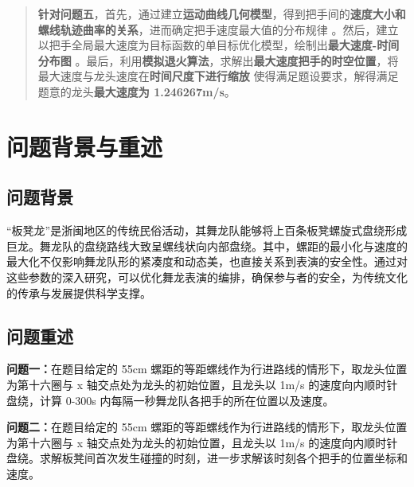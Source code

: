 \documentclass[a4paper]{article}
\begin{document}
\begin{abstract}
		\textbf{针对问题五}，首先，通过建立\textbf{运动曲线几何模型}，得到把手间的\textbf{速度大小和螺线轨迹曲率的关系}，进而确定把手速度最大值的分布规律%
		。然后，建立以把手全局最大速度为目标函数的单目标优化模型，绘制出\textbf{最大速度-时间分布图}%
		。最后，利用\textbf{模拟退火算法}，求解出\textbf{最大速度把手的时空位置}，将最大速度与龙头速度在\textbf{时间尺度下进行缩放}%
		使得满足题设要求，解得满足题意的龙头\textbf{最大速度为 1.246267m/s}。  \\
		\newline
	\end{abstract}

	\clearpage %

	\section{问题背景与重述}
	\subsection{问题背景}
	“板凳龙”是浙闽地区的传统民俗活动，其舞龙队能够将上百条板凳螺旋式盘绕形成巨龙。舞龙队的盘绕路线大致呈螺线状向内部盘绕。其中，螺距的最小化与速度的最大化不仅影响舞龙队形的紧凑度和动态美，也直接关系到表演的安全性。通过对这些参数的深入研究，可以优化舞龙表演的编排，确保参与者的安全，为传统文化的传承与发展提供科学支撑。


	\subsection{问题重述}
		\textbf{问题一：}在题目给定的 55cm 螺距的等距螺线作为行进路线的情形下，取龙头位置为第十六圈与 x 轴交点处为龙头的初始位置，且龙头以 1m/s 的速度向内顺时针盘绕，计算 0-300s 内每隔一秒舞龙队各把手的所在位置以及速度。

		\textbf{问题二：}在题目给定的 55cm 螺距的等距螺线作为行进路线的情形下，取龙头位置为第十六圈与 x 轴交点处为龙头的初始位置，且龙头以 1m/s 的速度向内顺时针盘绕。求解板凳间首次发生碰撞的时刻，进一步求解该时刻各个把手的位置坐标和速度。
\end{document}
